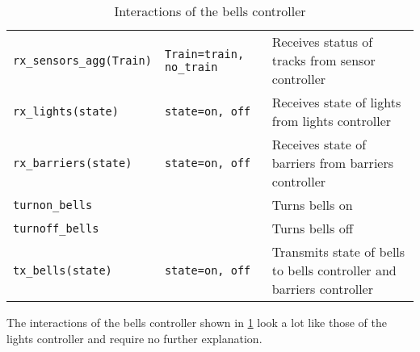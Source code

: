\documentclass[final]{report}
\begin{document}
\section{}
\begin{table}[H]
\centering
    \begin{tabular}{|l|l|l|}
    \hline
    \texttt{rx\_sensors\_agg(Train)} & \texttt{Train=train, no\_train} & Receives status of tracks from sensor controller                     \\
    \texttt{rx\_lights(state)}       & \texttt{state=on, off}          & Receives state of lights from lights controller                      \\
    \texttt{rx\_barriers(state)}     & \texttt{state=on, off}          & Receives state of barriers from barriers controller                  \\ \hline
    \texttt{turnon\_bells}           &                                 & Turns bells on                                                       \\
    \texttt{turnoff\_bells}          &                                 & Turns bells off                                                      \\
    \texttt{tx\_bells(state)}        & \texttt{state=on, off}          & Transmits state of bells to bells controller and barriers controller \\ \hline
    \end{tabular}
\caption{Interactions of the bells controller}
\label{tab:bellsSignals}
\end{table}

The interactions of the bells controller shown in \cref{tab:bellsSignals} look a lot like those of the lights controller and require no further explanation.
\end{document}
